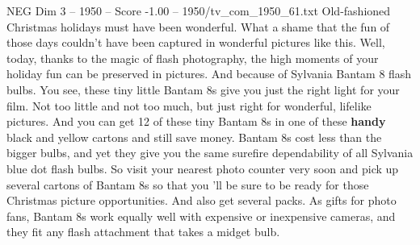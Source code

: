 \begin{textsample}{NEG Dim 3 – 1950 – Score -1.00 – 1950/tv\_com\_1950\_61.txt}  \label{ex:f3_neg_090}
Old-fashioned Christmas holidays must have been wonderful.
What a shame that the fun of those days couldn't have been captured in wonderful pictures like this.
Well, today, thanks to the magic of flash photography, the high moments of your holiday fun can be preserved in pictures.
And because of Sylvania Bantam 8 flash bulbs.
You see, these tiny little Bantam 8s give you just the right light for your film.
Not too little and not too much, but just right for wonderful, lifelike pictures.
And you can get 12 of these tiny Bantam 8s in one of these \textbf{handy} black and yellow cartons and still save money.
Bantam 8s cost less than the bigger bulbs, and yet they give you the same surefire dependability of all Sylvania blue dot flash bulbs.
So visit your nearest photo counter very soon and pick up several cartons of Bantam 8s so that you 'll be sure to be ready for those Christmas picture opportunities.
And also get several packs.
As gifts for photo fans, Bantam 8s work equally well with expensive or inexpensive cameras, and they fit any flash attachment that takes a midget bulb.

\end{textsample}
